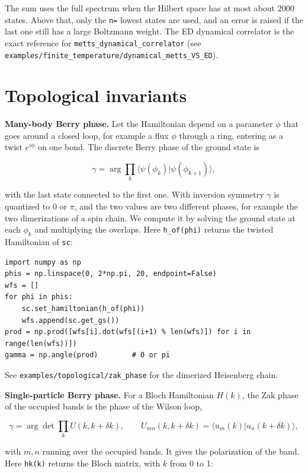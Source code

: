 \documentclass[11pt]{article}
\begin{document}
The sum uses the full spectrum when the Hilbert space has at most about
2000 states. Above that, only the \texttt{n=} lowest states are used, and an
error is raised if the last one still has a large Boltzmann weight. The
ED dynamical correlator is the exact reference for
\texttt{metts\_\allowbreak{}dynamical\_\allowbreak{}correlator} (see
\texttt{examples/finite\_\allowbreak{}temperature/dynamical\_\allowbreak{}metts\_\allowbreak{}VS\_\allowbreak{}ED}).

\section{Topological invariants}

\textbf{Many-body Berry phase.} Let the Hamiltonian depend on a parameter
\(\phi\) that goes around a closed loop, for example a flux \(\phi\) through a
ring, entering as a twist \(e^{i\phi}\) on one bond. The discrete Berry
phase of the ground state is

\[\gamma=\arg\prod_{k}\langle\psi(\phi_k)|\psi(\phi_{k+1})\rangle,\]

with the last state connected to the first one. With inversion symmetry
\(\gamma\) is quantized to \(0\) or \(\pi\), and the two values are two
different phases, for example the two dimerizations of a spin chain. We
compute it by solving the ground state at each \(\phi_k\) and multiplying
the overlaps. Here \texttt{h\_\allowbreak{}of(phi)} returns the twisted Hamiltonian of \texttt{sc}:

\begin{lstlisting}
import numpy as np
phis = np.linspace(0, 2*np.pi, 20, endpoint=False)
wfs = []
for phi in phis:
    sc.set_hamiltonian(h_of(phi))
    wfs.append(sc.get_gs())
prod = np.prod([wfs[i].dot(wfs[(i+1) % len(wfs)]) for i in range(len(wfs))])
gamma = np.angle(prod)        # 0 or pi
\end{lstlisting}

See \texttt{examples/topological/zak\_\allowbreak{}phase} for the dimerized Heisenberg chain.

\textbf{Single-particle Berry phase.} For a Bloch Hamiltonian \(H(k)\), the Zak
phase of the occupied bands is the phase of the Wilson loop,

\[\gamma=\arg\det\prod_k U(k,k+\delta k),\qquad
U_{mn}(k,k+\delta k)=\langle u_m(k)|u_n(k+\delta k)\rangle,\]

with \(m,n\) running over the occupied bands. It gives the polarization of
the band. Here \texttt{hk(k)} returns the Bloch matrix, with \(k\) from 0 to 1:
\end{document}
